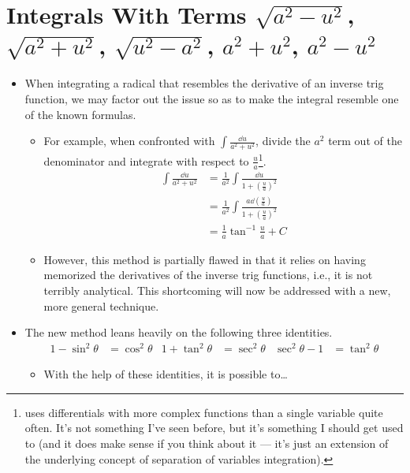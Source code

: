 \documentclass[../main.tex]{subfiles}
\begin{document}
\section{Integrals With Terms \texorpdfstring{$\sqrt{a^2-u^2}$}{TEXT}, \texorpdfstring{$\sqrt{a^2+u^2}$}{TEXT}, \texorpdfstring{$\sqrt{u^2-a^2}$}{TEXT}, \texorpdfstring{$a^2+u^2$}{TEXT}, \texorpdfstring{$a^2-u^2$}{TEXT}}
\begin{itemize}
    \item When integrating a radical that resembles the derivative of an inverse trig function, we may factor out the issue so as to make the integral resemble one of the known formulas.
    \begin{itemize}
        \item For example, when confronted with $\int\frac{\dd u}{a^2+u^2}$, divide the $a^2$ term out of the denominator and integrate with respect to $\frac{u}{a}$\footnote{\cite{bib:Thomas} uses differentials with more complex functions than a single variable quite often. It's not something I've seen before, but it's something I should get used to (and it does make sense if you think about it --- it's just an extension of the underlying concept of separation of variables integration).}.
        \begin{align*}
            \int\frac{\dd u}{a^2+u^2} &= \frac{1}{a^2}\int\frac{\dd u}{1+\left( \frac{u}{a} \right)^2}\\
            &= \frac{1}{a^2}\int\frac{a\dd{\left( \frac{u}{a} \right)}}{1+\left( \frac{u}{a} \right)^2}\\
            &= \frac{1}{a}\tan^{-1}\frac{u}{a}+C
        \end{align*}
        \item However, this method is partially flawed in that it relies on having memorized the derivatives of the inverse trig functions, i.e., it is not terribly analytical. This shortcoming will now be addressed with a new, more general technique.
    \end{itemize}
    \item The new method leans heavily on the following three identities.
    \begin{align*}
        1-\sin^2\theta &= \cos^2\theta&
        1+\tan^2\theta &= \sec^2\theta&
        \sec^2\theta-1 &= \tan^2\theta
    \end{align*}
    \begin{itemize}
        \item With the help of these identities, it is possible to\dots
        \begin{enumerate}

\end{enumerate}
\end{itemize}
\end{itemize}
\end{document}
